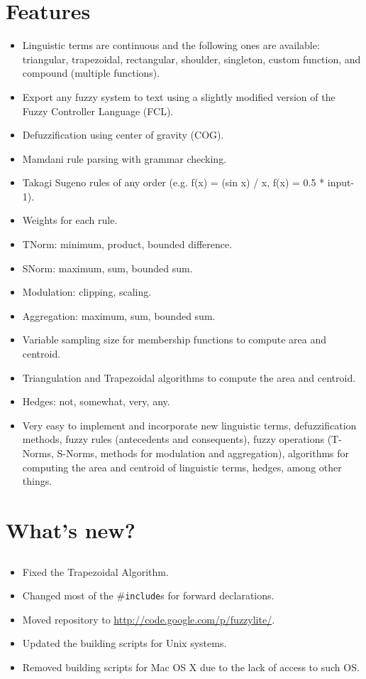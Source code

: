 \section{Features}
\begin{itemize}
	\item Linguistic terms are continuous and the following ones are available: triangular, trapezoidal, rectangular, shoulder, singleton, custom function, and compound (multiple functions).
	\item Export any fuzzy system to text using a slightly modified version of the Fuzzy Controller Language (FCL).
	\item Defuzzification using center of gravity (COG). 
	\item Mamdani rule parsing with grammar checking.
	\item Takagi Sugeno rules of any order (e.g. f(x) = (sin x) / x, f(x) = 0.5 * input-1).
	\item Weights for each rule.
	\item TNorm: minimum, product, bounded difference. 
	\item SNorm: maximum, sum, bounded sum. 
	\item Modulation: clipping, scaling. 
	\item Aggregation: maximum, sum, bounded sum.
	\item Variable sampling size for membership functions to compute area and centroid.
	\item Triangulation and Trapezoidal algorithms to compute the area and
	centroid.
	\item Hedges: not, somewhat, very, any. 
	\item Very easy to implement and incorporate new linguistic terms, defuzzification methods, fuzzy rules (antecedents and consequents), fuzzy operations (T-Norms, S-Norms, methods for modulation and aggregation), algorithms for computing the area and centroid of linguistic terms, hedges, among other things.
	
\end{itemize}

\section{What's new?}
	\subsection{\fl}
	\begin{itemize}
		\item Fixed the Trapezoidal Algorithm.
		\item Changed most of the \#\texttt{include}s for forward declarations.
		\item Moved repository to \url{http://code.google.com/p/fuzzylite/}.
		\item Updated the building scripts for Unix systems.
		\item Removed building scripts for Mac OS X due to the lack of access to such OS.
	\end{itemize}
	
